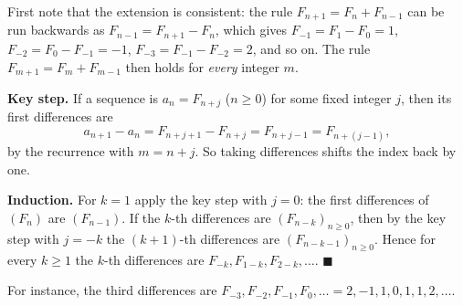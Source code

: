 First note that the extension is consistent: the rule $F_{n+1}=F_n+F_{n-1}$ can be run backwards as $F_{n-1}=F_{n+1}-F_n$, which gives $F_{-1}=F_1-F_0=1$, $F_{-2}=F_0-F_{-1}=-1$, $F_{-3}=F_{-1}-F_{-2}=2$, and so on. The rule $F_{m+1}=F_m+F_{m-1}$ then holds for \emph{every} integer $m$.

\textbf{Key step.} If a sequence is $a_n=F_{n+j}$ ($n\ge0$) for some fixed integer $j$, then its first differences are
\[
a_{n+1}-a_n=F_{n+j+1}-F_{n+j}=F_{n+j-1}=F_{n+(j-1)},
\]
by the recurrence with $m=n+j$. So taking differences shifts the index back by one.

\textbf{Induction.} For $k=1$ apply the key step with $j=0$: the first differences of $(F_n)$ are $(F_{n-1})$. If the $k$-th differences are $(F_{n-k})_{n\ge0}$, then by the key step with $j=-k$ the $(k+1)$-th differences are $(F_{n-k-1})_{n\ge0}$. Hence for every $k\ge1$ the $k$-th differences are $F_{-k},F_{1-k},F_{2-k},\dots$. $\blacksquare$

For instance, the third differences are $F_{-3},F_{-2},F_{-1},F_0,\dots=2,-1,1,0,1,1,2,\dots$.
